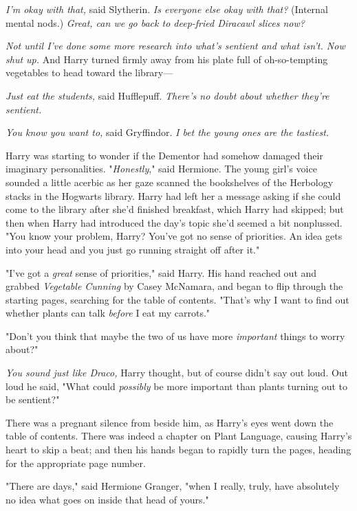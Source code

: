 \emph{I'm okay with that,} said Slytherin. \emph{Is everyone else okay with
that?} (Internal mental nods.) \emph{Great, can we go back to deep-fried
Diracawl slices now?}

\emph{Not until I've done some more research into what's sentient and what
isn't. Now shut up.} And Harry turned firmly away from his plate full of
oh-so-tempting vegetables to head toward the library---

\emph{Just eat the students,} said Hufflepuff. \emph{There's no doubt about
whether \emph{they're} sentient.}

\emph{You know you want to,} said Gryffindor. \emph{I bet the young ones are
the tastiest.}

Harry was starting to wonder if the Dementor had somehow damaged their
imaginary personalities.
\later
"\emph{Honestly}," said Hermione. The young girl's voice sounded a little
acerbic as her gaze scanned the bookshelves of the Herbology stacks in the
Hogwarts library. Harry had left her a message asking if she could come to the
library after she'd finished breakfast, which Harry had skipped; but then when
Harry had introduced the day's topic she'd seemed a bit nonplussed. "You know
your problem, Harry? You've got no sense of priorities. An idea gets into your
head and you just go running straight off after it."

"I've got a \emph{great} sense of priorities," said Harry. His hand reached out
and grabbed \emph{Vegetable Cunning} by Casey McNamara, and began to flip
through the starting pages, searching for the table of contents. "That's why I
want to find out whether plants can talk \emph{before} I eat my carrots."

"Don't you think that maybe the two of us have more \emph{important} things to
worry about?"

\emph{You sound just like Draco,} Harry thought, but of course didn't say out
loud. Out loud he said, "What could \emph{possibly} be more important than
plants turning out to be sentient?"

There was a pregnant silence from beside him, as Harry's eyes went down the
table of contents. There was indeed a chapter on Plant Language, causing
Harry's heart to skip a beat; and then his hands began to rapidly turn the
pages, heading for the appropriate page number.

"There are days," said Hermione Granger, "when I really, truly, have absolutely
no idea what goes on inside that head of yours."

